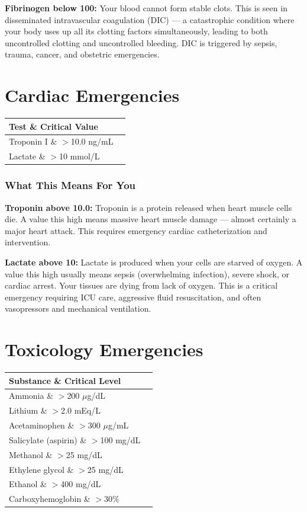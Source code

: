 \textbf{Fibrinogen below 100:} Your blood cannot form stable clots. This is seen in disseminated intravascular coagulation (DIC) --- a catastrophic condition where your body uses up all its clotting factors simultaneously, leading to both uncontrolled clotting and uncontrolled bleeding. DIC is triggered by sepsis, trauma, cancer, and obstetric emergencies.

\clearpage
\section{Cardiac Emergencies}

\begin{longtable}{@{}ll@{}}
\toprule
\textbf{Test} \& \textbf{Critical Value} \\
\midrule
Troponin I \& $>$10.0 ng/mL \\
Lactate \& $>$10 mmol/L \\
\bottomrule
\end{longtable}

\subsubsection{What This Means For You}

\textbf{Troponin above 10.0:} Troponin is a protein released when heart muscle cells die. A value this high means massive heart muscle damage --- almost certainly a major heart attack. This requires emergency cardiac catheterization and intervention.

\textbf{Lactate above 10:} Lactate is produced when your cells are starved of oxygen. A value this high usually means sepsis (overwhelming infection), severe shock, or cardiac arrest. Your tissues are dying from lack of oxygen. This is a critical emergency requiring ICU care, aggressive fluid resuscitation, and often vasopressors and mechanical ventilation.

\clearpage
\section{Toxicology Emergencies}

\begin{longtable}{@{}ll@{}}
\toprule
\textbf{Substance} \& \textbf{Critical Level} \\
\midrule
Ammonia \& $>$200 $\mu$g/dL \\
Lithium \& $>$2.0 mEq/L \\
Acetaminophen \& $>$300 $\mu$g/mL \\
Salicylate (aspirin) \& $>$100 mg/dL \\
Methanol \& $>$25 mg/dL \\
Ethylene glycol \& $>$25 mg/dL \\
Ethanol \& $>$400 mg/dL \\
Carboxyhemoglobin \& $>$30\% \\
\bottomrule
\end{longtable}

